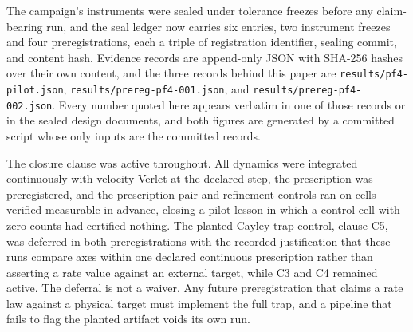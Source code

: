 \documentclass[aps,prd,reprint,nofootinbib,longbibliography]{revtex4-2}
\begin{document}
The campaign's instruments were sealed under tolerance freezes before
any claim-bearing run, and the seal ledger now carries six entries, two
instrument freezes and four preregistrations, each a triple of
registration identifier, sealing commit, and content hash.  Evidence
records are append-only JSON with SHA-256 hashes over their own
content, and the three records behind this paper are
\texttt{results/pf4-pilot.json},
\texttt{results/prereg-pf4-001.json}, and
\texttt{results/prereg-pf4-002.json}.
Every number quoted here appears verbatim in one of those records or in
the sealed design documents, and both figures are generated by a
committed script whose only inputs are the committed records.

The closure clause was active throughout.  All dynamics were integrated
continuously with velocity Verlet at the declared step, the prescription
was preregistered, and the prescription-pair and refinement controls ran
on cells verified measurable in advance, closing a pilot lesson in which
a control cell with zero counts had certified nothing.  The planted
Cayley-trap control, clause C5, was deferred in both preregistrations
with the recorded justification that these runs compare axes within one
declared continuous prescription rather than asserting a rate value
against an external target, while C3 and C4 remained active.  The
deferral is not a waiver.  Any future preregistration that claims a rate
law against a physical target must implement the full trap, and a
pipeline that fails to flag the planted artifact voids its own run.
\end{document}
